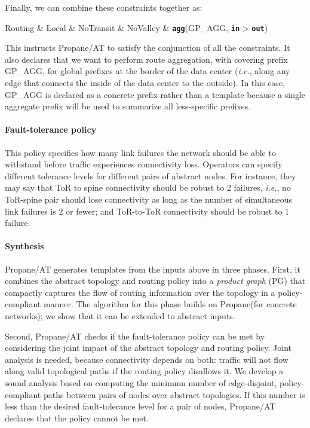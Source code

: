 \documentclass[numbers, 10pt]{sigplanconf}
\newcommand{\ryan}[1]{\textcolor{green}{[ryan: #1]}}
\newcommand{\IE}{\emph{i.e.}}
\newcommand{\sysname}{{\text{}\small \sf Propane/AT}\xspace}
\newcommand{\Propane}{{\text{}\small \sf Propane}\xspace}
\newcommand{\para}[1]{\paragraph*{\textbf{#1}}}
\newcommand{\KW}[1]{\texttt{\small\bfseries{#1}}}
\newcommand{\Agg}{\KW{agg}}
\newcommand{\In}{\KW{in}}
\newcommand{\Out}{\KW{out}}
\begin{document}
Finally, we can combine these constraints together as:

\begin{code}
Routing & Local & NoTransit &
NoValley & \Agg(GP_AGG, \In -> \Out)
\end{code}
\noindent
This instructs \sysname to satisfy the conjunction of all the constraints. It also declares that we want to perform route aggregation, with covering prefix {\small GP\_AGG}, for global prefixes at the border of the data center (\IE, along any edge that connects the inside of the data center to the outside). In this case, {\small GP\_AGG} is declared as a concrete prefix rather than a template because a single aggregate prefix will be used to summarize all less-specific prefixes.

\para{Fault-tolerance policy} This policy specifies how many link failures the network should be able to withstand before traffic experiences connectivity loss. Operators can specify different tolerance levels for different pairs of abstract nodes. For instance, they may say that ToR to spine connectivity should be robust to 2 failures, \IE, no ToR-spine pair should lose connectivity as long as the number of simultaneous link failures is 2 or fewer; and ToR-to-ToR connectivity should be robust to 1 failure.

\para{Synthesis} \sysname generates templates from the inputs above in three phases. First, it combines the abstract topology and routing policy into a {\em product graph} (PG) that compactly captures the flow of routing information over the topology in a policy-compliant manner. The algorithm for this phase builds on \Propane (for concrete networks); we show that it can be extended to abstract inputs.

Second, \sysname checks if the fault-tolerance policy can be met by considering the joint impact of the abstract topology and routing policy. Joint analysis is needed, because connectivity depends on both: traffic will not flow along valid topological paths if the routing policy disallows it.
%
We develop a sound analysis based on computing the minimum
number of edge-disjoint, policy-compliant paths between pairs of nodes
over abstract topologies. If this number is less
than the desired fault-tolerance level for a pair of nodes, \sysname declares that the
policy cannot be met.
\end{document}
